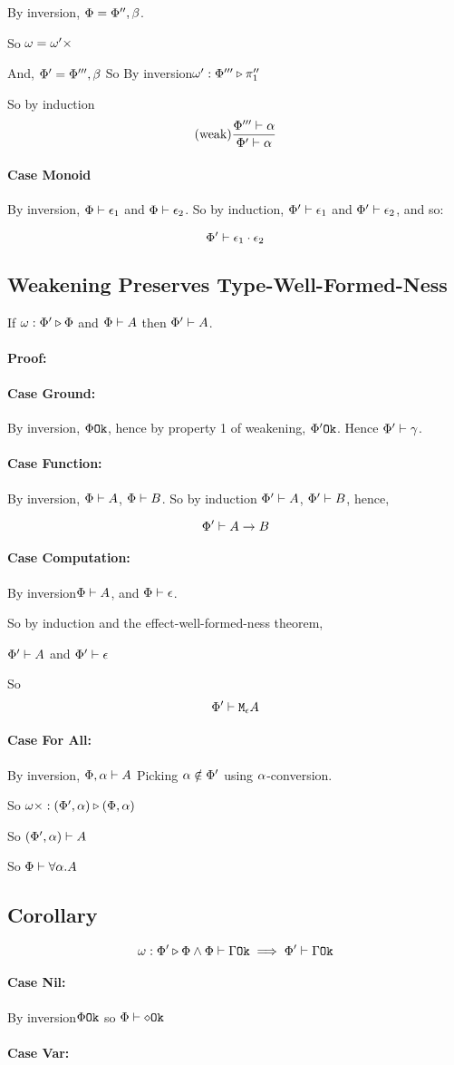 \documentclass{report}
\newcommand\wrelw[2]{\wrel{\w}{#1}{#2}}
\newcommand\proof[0]{\paragraph{Proof:}}
\newcommand{\case}[1]{\paragraph{Case #1:}}
\newcommand\bi[0]{By inversion}
\begin{document}
\bi, $\Phi = \Phi'', \beta$.

So $\omega = \omega'\times$

And, $\Phi' = \Phi''', \beta$
So \bi $\omega' : \Phi''' \triangleright \pi_1''$

So by induction
\begin{equation}
    (\text{weak}) \frac{\Phi'''\vdash \alpha}{\Phi'\vdash \alpha}
\end{equation}


\paragraph{Case Monoid}

\bi, $\Phi\vdash \epsilon_1$ and $\Phi\vdash \epsilon_2$. So by induction,
$\Phi'\vdash \epsilon_1$ and $\Phi'\vdash \epsilon_2$, and so:

\begin{equation}
    \Phi'\vdash \epsilon_1\cdot\epsilon_2
\end{equation}
\subsection{Weakening Preserves Type-Well-Formed-Ness}

If $\wrelw{\P'}{\P}$ and $\Phi\vdash A$ then $\Phi'\vdash A$.

\proof
\case{Ground}
\bi, $\Phi \texttt{Ok}$, hence by property 1 of weakening, $\Phi' \texttt{Ok}$. Hence $\Phi'\vdash \gamma$.
\case{Function}
\bi, $\Phi\vdash A$, $\Phi\vdash B$.
So by induction $\Phi'\vdash A$, $\Phi'\vdash B$, hence,

$$\Phi'\vdash A\rightarrow B$$

\case{Computation}

\bi $\Phi\vdash A$, and $\Phi\vdash \epsilon$.

So by induction and the effect-well-formed-ness theorem, 

$\Phi'\vdash A$ and $\Phi'\vdash \epsilon$

So $$\Phi'\vdash \texttt{M}_{\epsilon}{A}$$

\case{For All}
\bi, $\Phi,\alpha\vdash A$
Picking $\alpha\notin\Phi'$ using $\alpha$-conversion.

So $\omega\times : (\Phi', \alpha) \triangleright (\Phi, \alpha)$

So $(\Phi', \alpha)\vdash A$

So $\Phi\vdash \forall \alpha. A$

\subsection{Corollary}
$$\omega : \Phi' \triangleright \Phi\wedge \Phi\vdash \Gamma \texttt{Ok} \implies \Phi'\vdash \Gamma \texttt{Ok}$$
\case{Nil}
\bi $\Phi \texttt{Ok}$ so $\Phi\vdash \diamond \texttt{Ok}$
\case{Var}
\end{document}
